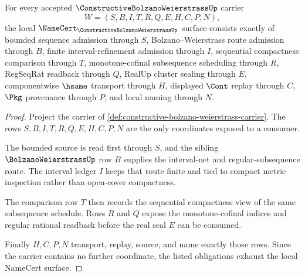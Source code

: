 \begin{theorem}
\label{thm:constructive-bolzano-weierstrass-namecert-obligations}
For every accepted $\ConstructiveBolzanoWeierstrassUp$ carrier
$$
W=(S,B,I,T,R,Q,E,H,C,P,N),
$$
the local $\NameCert_{\ConstructiveBolzanoWeierstrassUp}$ surface consists exactly of bounded sequence admission through $S$, Bolzano--Weierstrass route admission through $B$, finite interval-refinement admission through $I$, sequential compactness comparison through $T$, monotone-cofinal subsequence scheduling through $R$, RegSeqRat readback through $Q$, RealUp cluster sealing through $E$, componentwise $\hsame$ transport through $H$, displayed $\Cont$ replay through $C$, $\Pkg$ provenance through $P$, and local naming through $N$.
\end{theorem}
\begin{proof}
Project the carrier of \autoref{def:constructive-bolzano-weierstrass-carrier}. The rows $S,B,I,T,R,Q,E,H,C,P,N$ are the only coordinates exposed to a consumer.

The bounded source is read first through $S$, and the sibling $\BolzanoWeierstrassUp$ row $B$ supplies the interval-net and regular-subsequence route. The interval ledger $I$ keeps that route finite and tied to compact metric inspection rather than open-cover compactness.

The comparison row $T$ then records the sequential compactness view of the same subsequence schedule. Rows $R$ and $Q$ expose the monotone-cofinal indices and regular rational readback before the real seal $E$ can be consumed.

Finally $H,C,P,N$ transport, replay, source, and name exactly those rows. Since the carrier contains no further coordinate, the listed obligations exhaust the local NameCert surface.
\end{proof}

